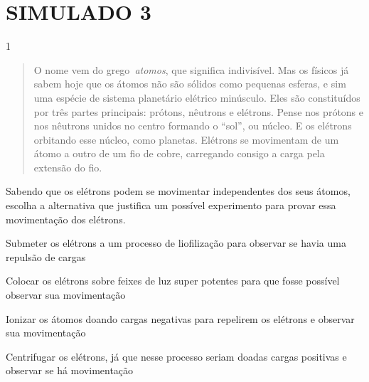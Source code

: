 \chapter{SIMULADO 3}

\num{1}
\begin{quote}
  O nome vem do grego~\emph{atomos}, que significa indivisível. Mas os
  físicos já sabem hoje que os átomos não são sólidos como pequenas
  esferas, e sim uma espécie de sistema planetário elétrico minúsculo.
  Eles são constituídos por três partes principais: prótons, nêutrons e
  elétrons. Pense nos prótons e nos nêutrons unidos no centro formando o
  ``sol'', ou núcleo. E os elétrons orbitando esse núcleo, como
  planetas. Elétrons se movimentam de um átomo a outro de um fio de
  cobre, carregando consigo a carga pela extensão do fio.

\end{quote}

Sabendo que os elétrons podem se movimentar independentes dos seus
átomos, escolha a alternativa que justifica um possível experimento para
provar essa movimentação dos elétrons.

\begin{escolha}
\item
  Submeter os elétrons a um processo de liofilização para observar se
  havia uma repulsão de cargas
\item
  Colocar os elétrons sobre feixes de luz super potentes para que fosse
  possível observar sua movimentação
\item
  Ionizar os átomos doando cargas negativas para repelirem os elétrons e
  observar sua movimentação
\item
  Centrifugar os elétrons, já que nesse processo seriam doadas cargas
  positivas e observar se há movimentação
\end{escolha}


